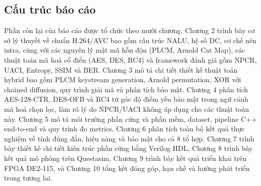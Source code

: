 \subsection{Cấu trúc báo cáo}

Phần còn lại của báo cáo được tổ chức theo mười chương. Chương 2 trình bày cơ sở lý thuyết về chuẩn H.264/AVC bao gồm cấu trúc NALU, hệ số DC, cơ chế nén intra, cùng với các nguyên lý mật mã hỗn độn (PLCM, Arnold Cat Map), các thuật toán mã hoá cổ điển (AES, DES, RC4) và framework đánh giá gồm NPCR, UACI, Entropy, SSIM và BER. Chương 3 mô tả chi tiết thiết kế thuật toán hybrid bao gồm PLCM keystream generation, Arnold permutation, XOR với chained diffusion, quy trình giải mã và phân tích bảo mật. Chương 4 phân tích AES-128-CTR, DES-OFB và RC4 từ góc độ điểm yếu bảo mật trong ngữ cảnh mã hoá chọn lọc, làm rõ lý do NPCR/UACI không áp dụng cho các thuật toán này. Chương 5 mô tả môi trường phần cứng và phần mềm, dataset, pipeline C++ end-to-end và quy trình đo metrics. Chương 6 phân tích toàn bộ kết quả thực nghiệm về tính đúng đắn, hiệu năng và bảo mật cho cả 8 tổ hợp. Chương 7 trình bày thiết kế chi tiết kiến trúc phần cứng bằng Verilog HDL, Chương 8 trình bày kết quả mô phỏng trên Questasim, Chương 9 trình bày kết quả triển khai trên FPGA DE2-115, và Chương 10 tổng kết đóng góp, hạn chế và hướng phát triển trong tương lai.
